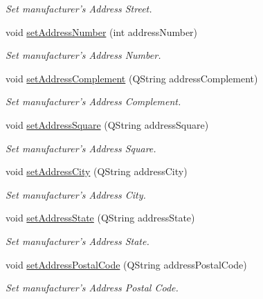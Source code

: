 \begin{DoxyCompactItemize}
\begin{DoxyCompactList}\small\item\em \-Set manufacturer's \-Address \-Street. \end{DoxyCompactList}\item 
void \hyperlink{class_manufacturer_a775c24b7aefafbf3cede00ffaea4fdf2}{set\-Address\-Number} (int address\-Number)
\begin{DoxyCompactList}\small\item\em \-Set manufacturer's \-Address \-Number. \end{DoxyCompactList}\item 
void \hyperlink{class_manufacturer_ab4a7fccad9841c2308d79513bccafd20}{set\-Address\-Complement} (\-Q\-String address\-Complement)
\begin{DoxyCompactList}\small\item\em \-Set manufacturer's \-Address \-Complement. \end{DoxyCompactList}\item 
void \hyperlink{class_manufacturer_aa015f8b4caa1843aa651e528cbdd904c}{set\-Address\-Square} (\-Q\-String address\-Square)
\begin{DoxyCompactList}\small\item\em \-Set manufacturer's \-Address \-Square. \end{DoxyCompactList}\item 
void \hyperlink{class_manufacturer_a7dd076709392099d9a4a6b2ab0a627b7}{set\-Address\-City} (\-Q\-String address\-City)
\begin{DoxyCompactList}\small\item\em \-Set manufacturer's \-Address \-City. \end{DoxyCompactList}\item 
void \hyperlink{class_manufacturer_a9481cf1890a331546f817d050c97a2da}{set\-Address\-State} (\-Q\-String address\-State)
\begin{DoxyCompactList}\small\item\em \-Set manufacturer's \-Address \-State. \end{DoxyCompactList}\item 
void \hyperlink{class_manufacturer_aa68b61eb6c2ca559938096778189be7f}{set\-Address\-Postal\-Code} (\-Q\-String address\-Postal\-Code)
\begin{DoxyCompactList}\small\item\em \-Set manufacturer's \-Address \-Postal \-Code. \end{DoxyCompactList}\end{DoxyCompactItemize}


